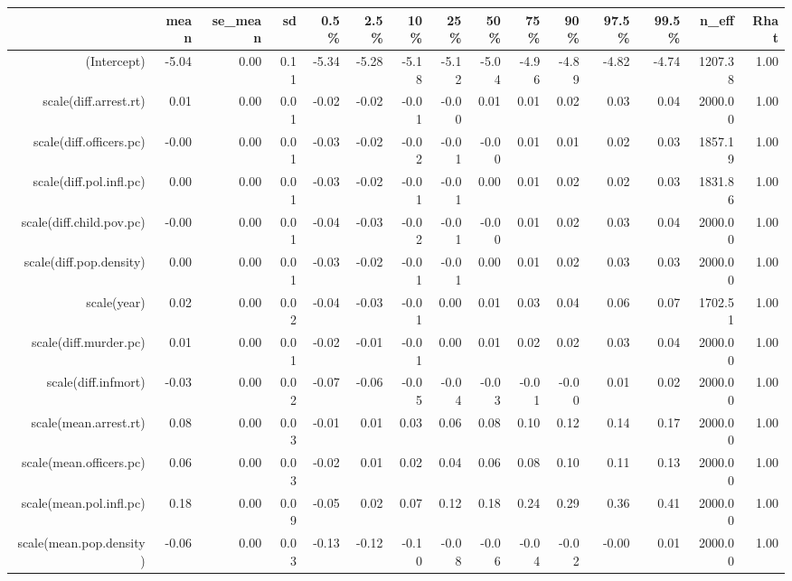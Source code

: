 \begin{table}[ht]
\centering
\begin{tabular}{rrrrrrrrrrrrrrr}
  \hline
 & mean & se\_mean & sd & 0.5\% & 2.5\% & 10\% & 25\% & 50\% & 75\% & 90\% & 97.5\% & 99.5\% & n\_eff & Rhat \\ 
  \hline
(Intercept) & -5.04 & 0.00 & 0.11 & -5.34 & -5.28 & -5.18 & -5.12 & -5.04 & -4.96 & -4.89 & -4.82 & -4.74 & 1207.38 & 1.00 \\ 
  scale(diff.arrest.rt) & 0.01 & 0.00 & 0.01 & -0.02 & -0.02 & -0.01 & -0.00 & 0.01 & 0.01 & 0.02 & 0.03 & 0.04 & 2000.00 & 1.00 \\ 
  scale(diff.officers.pc) & -0.00 & 0.00 & 0.01 & -0.03 & -0.02 & -0.02 & -0.01 & -0.00 & 0.01 & 0.01 & 0.02 & 0.03 & 1857.19 & 1.00 \\ 
  scale(diff.pol.infl.pc) & 0.00 & 0.00 & 0.01 & -0.03 & -0.02 & -0.01 & -0.01 & 0.00 & 0.01 & 0.02 & 0.02 & 0.03 & 1831.86 & 1.00 \\ 
  scale(diff.child.pov.pc) & -0.00 & 0.00 & 0.01 & -0.04 & -0.03 & -0.02 & -0.01 & -0.00 & 0.01 & 0.02 & 0.03 & 0.04 & 2000.00 & 1.00 \\ 
  scale(diff.pop.density) & 0.00 & 0.00 & 0.01 & -0.03 & -0.02 & -0.01 & -0.01 & 0.00 & 0.01 & 0.02 & 0.03 & 0.03 & 2000.00 & 1.00 \\ 
  scale(year) & 0.02 & 0.00 & 0.02 & -0.04 & -0.03 & -0.01 & 0.00 & 0.01 & 0.03 & 0.04 & 0.06 & 0.07 & 1702.51 & 1.00 \\ 
  scale(diff.murder.pc) & 0.01 & 0.00 & 0.01 & -0.02 & -0.01 & -0.01 & 0.00 & 0.01 & 0.02 & 0.02 & 0.03 & 0.04 & 2000.00 & 1.00 \\ 
  scale(diff.infmort) & -0.03 & 0.00 & 0.02 & -0.07 & -0.06 & -0.05 & -0.04 & -0.03 & -0.01 & -0.00 & 0.01 & 0.02 & 2000.00 & 1.00 \\ 
  scale(mean.arrest.rt) & 0.08 & 0.00 & 0.03 & -0.01 & 0.01 & 0.03 & 0.06 & 0.08 & 0.10 & 0.12 & 0.14 & 0.17 & 2000.00 & 1.00 \\ 
  scale(mean.officers.pc) & 0.06 & 0.00 & 0.03 & -0.02 & 0.01 & 0.02 & 0.04 & 0.06 & 0.08 & 0.10 & 0.11 & 0.13 & 2000.00 & 1.00 \\ 
  scale(mean.pol.infl.pc) & 0.18 & 0.00 & 0.09 & -0.05 & 0.02 & 0.07 & 0.12 & 0.18 & 0.24 & 0.29 & 0.36 & 0.41 & 2000.00 & 1.00 \\ 
  scale(mean.pop.density) & -0.06 & 0.00 & 0.03 & -0.13 & -0.12 & -0.10 & -0.08 & -0.06 & -0.04 & -0.02 & -0.00 & 0.01 & 2000.00 & 1.00 \\ 

\end{tabular}
\end{table}
